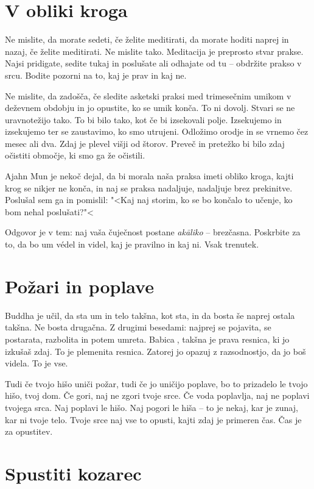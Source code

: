 \section{V obliki kroga}

Ne mislite, da morate sedeti, če želite meditirati, da morate hoditi naprej in nazaj, če želite meditirati. Ne mislite tako. Meditacija je preprosto stvar prakse. Najsi pridigate, sedite tukaj in poslušate ali odhajate od tu – obdržite prakso v srcu. Bodite pozorni na to, kaj je prav in kaj ne.

Ne mislite, da zadošča, če sledite asketski praksi med trimesečnim umikom v deževnem obdobju in jo opustite, ko se umik konča. To ni dovolj. Stvari se ne uravnotežijo tako. To bi bilo tako, kot če bi izsekovali polje. Izsekujemo in izsekujemo ter se zaustavimo, ko smo utrujeni. Odložimo orodje in se vrnemo čez mesec ali dva. Zdaj je plevel višji od štorov. Preveč in pretežko bi bilo zdaj očistiti območje, ki smo ga že očistili.

Ajahn Mun je nekoč dejal, da bi morala naša praksa imeti obliko kroga, kajti krog se nikjer ne konča, in naj se praksa nadaljuje, nadaljuje brez prekinitve. Poslušal sem ga in pomislil: "<Kaj naj storim, ko se bo končalo to učenje, ko bom nehal poslušati?"<

Odgovor je v tem: naj vaša čuječnost postane \emph{akāliko} – brezčasna. Poskrbite za to, da bo um védel in videl, kaj je pravilno in kaj ni. Vsak trenutek.

\section{Požari in poplave}

Buddha je učil, da sta um in telo takšna, kot sta, in da bosta še naprej ostala takšna. Ne bosta drugačna. Z drugimi besedami: najprej se pojavita, se postarata, razbolita in potem umreta. Babica, takšna je prava resnica, ki jo izkušaš zdaj. To je plemenita resnica. Zatorej jo opazuj z razsodnostjo, da jo boš videla. To je vse.

Tudi če tvojo hišo uniči požar, tudi če jo uničijo poplave, bo to prizadelo le tvojo hišo, tvoj dom. Če gori, naj ne zgori tvoje srce. Če voda poplavlja, naj ne poplavi tvojega srca. Naj poplavi le hišo. Naj pogori le hiša – to je nekaj, kar je zunaj, kar ni tvoje telo. Tvoje srce naj vse to opusti, kajti zdaj je primeren čas. Čas je za opustitev.

\section{Spustiti kozarec}

